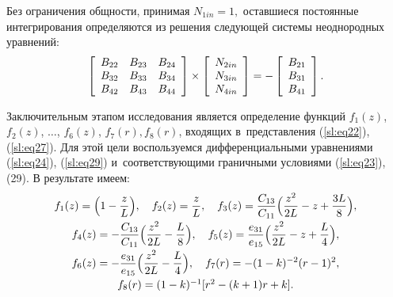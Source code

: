Без ограничения общности, принимая 
$
N_{1in} =1, 
$
оставшиеся постоянные интегрирования определяются из решения следующей системы неоднородных уравнений:
\begin{equation}
\label{sl:eq39}
\left[ {{\begin{array}{*{20}c}
 {B_{22} }   & {B_{23} }   & {B_{24} }   \\
 {B_{32} }   & {B_{33} }   & {B_{34} }   \\
 {B_{42} }   & {B_{43} }   & {B_{44} }   \\
\end{array} }} \right]\times \left[ {{\begin{array}{*{20}c}
 {N_{2in} }   \\
 {N_{3in} }   \\
 {N_{4in} }   \\
\end{array} }} \right]= -\left[ {{\begin{array}{*{20}c}
 {B_{21} }   \\
 {B_{31} }   \\
 {B_{41} }   \\
\end{array} }} \right].
\end{equation}

\smallskip

Заключительным этапом исследования является определение функций $f_1 (z)$, $f_2 (z)$, $\ldots$, $f_6(z)$, $f_7 (r), f_8 (r)$, входящих в~представления (\ref{sl:eq22}), (\ref{sl:eq27}). 
Для этой цели воспользуемся дифференциальными уравнениями (\ref{sl:eq24}), (\ref{sl:eq29}) и~соответствующими граничными условиями (\ref{sl:eq23}), 
(29). 
В результате имеем:
\begin{equation}
\label{sl:eq40}
\begin{array}{c}
\displaystyle
f_1 (z)=\Bigl( 1-\frac{z}{L} \Bigr), \quad f_2 (z)=\frac{z}{L}, \quad
f_3 (z)=\frac{C_{13} }{C_{11} }\Bigl( \frac{z^2}{2L}-z+\frac{3L}{8} \Bigr), \vspace{1mm}\\
\displaystyle
f_4 (z)=-\frac{C_{13} }{C_{11} }\Bigl( \frac{z^2}{2L}-\frac{L}{8} \Bigr), \quad
f_5 (z)=\frac{e_{31} }{e_{15} }\Bigl( \frac{z^2}{2L}-z+\frac{L}{4} \Bigr), \vspace{1mm} \\ \displaystyle
f_6 (z)=-\frac{e_{31} }{e_{15} }\Bigl( \frac{z^2}{2L}-\frac{L}{4} \Bigr), 
\quad
f_7 (r)=-( 1-k)^{-2}(r-1)^2, \vspace{1mm} \\ f_8 (r)=(1-k)^{-1}[r^2-(k+1)r+k].
\end{array}
\end{equation}

